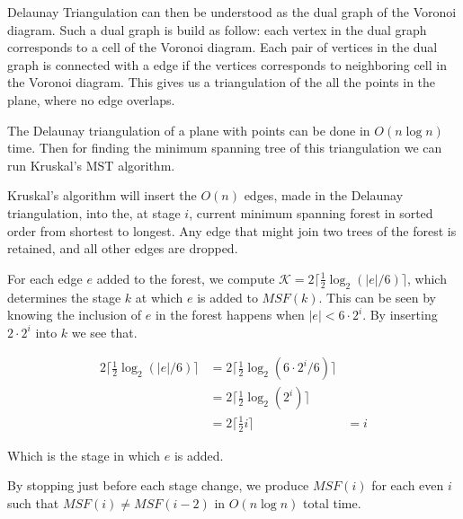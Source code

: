Delaunay Triangulation can then be understood as the dual graph of the Voronoi diagram. Such a dual graph 
is build as follow: each vertex in the dual graph corresponds to a cell of the Voronoi diagram. Each pair 
of vertices in the dual graph is connected with a edge if the vertices corresponds to neighboring cell in the Voronoi 
diagram. This gives us a triangulation of the all the points in the plane, where no edge overlaps.


The Delaunay triangulation of a plane with points can be done in $O(n \log n)$ time\cite{CompGeo}. 
Then for finding the minimum spanning tree of this triangulation we can run Kruskal's MST 
algorithm\cite{IntroToAlg}. 

Kruskal's algorithm will insert the $O(n)$ edges, made in the Delaunay triangulation, into the, at 
stage $i$, current minimum spanning forest in sorted order from shortest to longest. Any edge that 
might join two trees of the forest is retained, and all other edges are dropped. 

For each edge $e$ added to the forest, we compute $\mathcal{K} = 2 \lceil \frac{1}{2} \log_2 (|e|/6) \rceil$, 
which determines the stage $k$ at which $e$ is added to $MSF(k)$. This can be seen by knowing the 
inclusion of $e$ in the forest happens when $|e| < 6 \cdot 2^i$. By inserting $ 2 \cdot 2^i$ into 
$k$ we see that. 

\begin{align*}
    2 \lceil \frac{1}{2} \log_2 (|e|/6) \rceil &= 2 \lceil \frac{1}{2} \log_2 (6 \cdot 2^i/6) \rceil \\
    &= 2 \lceil \frac{1}{2} \log_2 (2^i) \rceil \\
    &= 2 \lceil \frac{1}{2} i \rceil
    &= i
\end{align*}

Which is the stage in which $e$ is added. 

By stopping just before each stage change, we produce $MSF(i)$ for each even $i$ such that $MSF(i) \neq MSF(i-2)$ 
in $O(n \log n)$ total time.  

